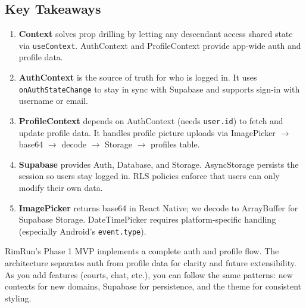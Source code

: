 \documentclass[11pt,a4paper]{article}
\begin{document}
\subsection{Key Takeaways}

\begin{enumerate}
    \item \textbf{Context} solves prop drilling by letting any descendant access shared state via \texttt{useContext}. AuthContext and ProfileContext provide app-wide auth and profile data.
    \item \textbf{AuthContext} is the source of truth for who is logged in. It uses \texttt{onAuthStateChange} to stay in sync with Supabase and supports sign-in with username or email.
    \item \textbf{ProfileContext} depends on AuthContext (needs \texttt{user.id}) to fetch and update profile data. It handles profile picture uploads via ImagePicker $\rightarrow$ base64 $\rightarrow$ decode $\rightarrow$ Storage $\rightarrow$ profiles table.
    \item \textbf{Supabase} provides Auth, Database, and Storage. AsyncStorage persists the session so users stay logged in. RLS policies enforce that users can only modify their own data.
    \item \textbf{ImagePicker} returns base64 in React Native; we decode to ArrayBuffer for Supabase Storage. DateTimePicker requires platform-specific handling (especially Android's \texttt{event.type}).
\end{enumerate}

RimRun's Phase 1 MVP implements a complete auth and profile flow. The architecture separates auth from profile data for clarity and future extensibility. As you add features (courts, chat, etc.), you can follow the same patterns: new contexts for new domains, Supabase for persistence, and the theme for consistent styling.
\end{document}

